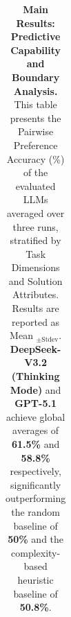 \begin{table}[!ht]
\begin{tabular}{ll | ccc | ccc | ccc | c}
        \bottomrule
    \end{tabular}
    \caption{\textbf{Main Results: Predictive Capability and Boundary Analysis.}
    This table presents the Pairwise Preference Accuracy (\%) of the evaluated LLMs averaged over three runs, stratified by Task Dimensions and Solution Attributes. Results are reported as Mean $_{\pm \text{Stdev}}$.
    \textbf{DeepSeek-V3.2 (Thinking Mode)} and \textbf{GPT-5.1} achieve global averages of \textbf{61.5\%} and \textbf{58.8\%} respectively, significantly outperforming the random baseline of \textbf{50\%} and the complexity-based heuristic baseline of \textbf{50.8\%}.}

    \label{tab:final_compact_matrix_clean}

\end{table}

